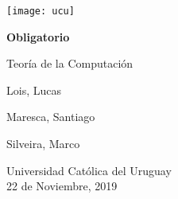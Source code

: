 \begin{titlepage}
    \begin{center}
        \texttt{[image: ucu]}

	\vspace*{5cm}

        \Huge
        \textbf{Obligatorio}

        \vspace{0.5cm}
        \LARGE
	Teoría de la Computación

        \vspace{3.5cm}

        Lois, Lucas

        Maresca, Santiago

        Silveira, Marco

        \vfill

        \Large
        Universidad Católica del Uruguay\\
        22 de Noviembre, 2019

    \end{center}
\end{titlepage}
